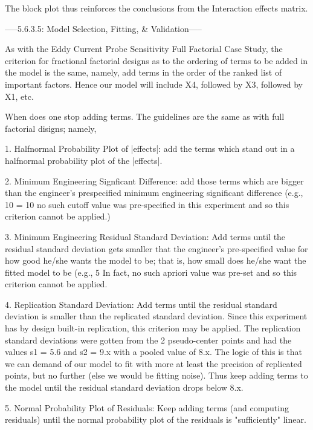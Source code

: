    The block plot thus reinforces the conclusions from the
   Interaction effects matrix.

-----5.6.3.5: Model Selection, Fitting, & Validation-----

As with the Eddy Current Probe Sensitivity Full
Factorial Case Study, the criterion for fractional
factorial designs as to the ordering of terms to be
added in the model is the same, namely, add terms in
the order of the ranked list of important factors.
Hence our model will include X4, followed by X3,
followed by X1, etc.

When does one stop adding terms.  The guidelines are
the same as with full factorial disigns; namely,

1. Halfnormal Probability Plot of |effects|: add the
   terms which stand out in a halfnormal probability
   plot of the |effects|.

2. Minimum Engineering Signficant Difference: add those
   terms which are bigger than the engineer's
   prespecified minimum engineering significant
   difference (e.g., 10%
   = 10%
   no such cutoff value was pre-specified in this
   experiment and so this criterion cannot be applied.)

3. Minimum Engineering Residual Standard Deviation: Add
   terms until the residual standard deviation gets
   smaller that the engineer's pre-specified value for
   how good he/she wants the model to be; that is, how
   small does he/she want the fitted model to be (e.g.,
   5%
   In fact, no such apriori value was pre-set and so
   this criterion cannot be applied.

4. Replication Standard Deviation: Add terms until the
   residual standard deviation is smaller than the
   replicated standard deviation.  Since this
   experiment has by design built-in replication, this
   criterion may be applied.  The replication standard
   deviations were gotten from the 2 pseudo-center
   points and had the values s1 = 5.6 and s2 = 9.x with
   a pooled value of 8.x.  The logic of this is that we
   can demand of our model to fit with more at least
   the precision of replicated points, but no further
   (else we would be fitting noise).  Thus keep adding
   terms to the model until the residual standard
   deviation drops below 8.x.

5. Normal Probability Plot of Residuals: Keep adding
   terms (and computing residuals) until the normal
   probability plot of the residuals is "sufficiently"
   linear.

